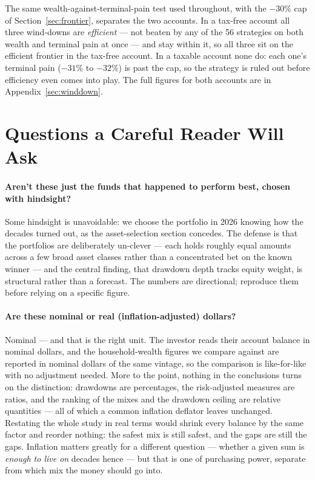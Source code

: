 \documentclass[11pt]{article}
\begin{document}
The same wealth-against-terminal-pain test used throughout, with the $-30\%$ cap of
Section~\ref{sec:frontier}, separates the two accounts. In a tax-free account all three wind-downs are
\emph{efficient} --- not beaten by any of the 56 strategies on both wealth and terminal pain at once ---
and stay within it, so all three sit on the efficient frontier in the tax-free account. In
a taxable account none do: each one's terminal pain ($-31\%$ to $-32\%$) is past the cap, so the
strategy is ruled out before efficiency even comes into play. The full figures for both accounts are in
Appendix~\ref{sec:winddown}.

\section{Questions a Careful Reader Will Ask}\label{sec:critiques}

\paragraph{Aren't these just the funds that happened to perform best, chosen with hindsight?}
Some hindsight is unavoidable: we choose the portfolio in 2026 knowing how the decades turned out, as
the asset-selection section concedes. The defense is that the portfolios are deliberately un-clever ---
each holds roughly equal amounts across a few broad asset classes rather than a concentrated bet on the
known winner --- and the central finding, that drawdown depth tracks equity weight, is structural rather
than a forecast. The numbers are directional; reproduce them before relying on a specific figure.

\paragraph{Are these nominal or real (inflation-adjusted) dollars?}
Nominal --- and that is the right unit. The investor reads their account balance in
nominal dollars, and the household-wealth figures we compare against are reported in nominal dollars of the same
vintage, so the comparison is like-for-like with no adjustment needed. More to the point, nothing in the
conclusions turns on the distinction: drawdowns are percentages, the risk-adjusted measures are ratios,
and the ranking of the mixes and the drawdown ceiling are relative quantities --- all of which a common
inflation deflator leaves unchanged. Restating the whole study in real terms would shrink every balance
by the same factor and reorder nothing: the safest mix is still safest, and the gaps are still the gaps.
Inflation matters greatly for a different question --- whether a given sum is \emph{enough to live on}
decades hence --- but that is one of purchasing power, separate from which mix the money should go into.
\end{document}
